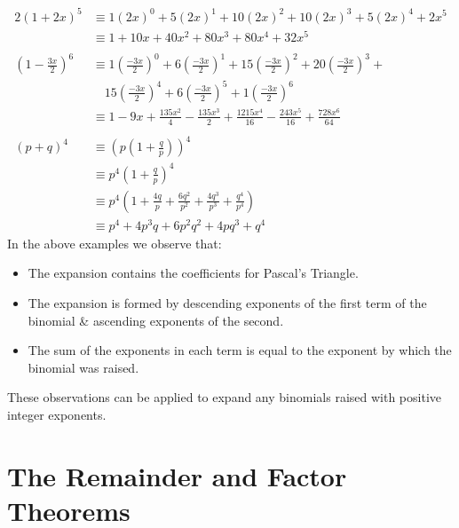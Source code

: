 \documentclass[12pt, a4paper]{report}
\theoremstyle{definition}
\begin{document}
	\begin{alignat*}{2}
		(1+2x)^5                      & \equiv 1(2x)^0 + 5(2x)^1 + 10(2x)^2 + 10(2x)^3 + 5(2x)^4 + 2x^5\tag*{a)}                                                                          \\
		& \equiv 1 + 10x + 40x^2 + 80x^3 + 80x^4 + 32x^5                                                                                                    \\
		\\	
		\left(1-\frac{3x}{2}\right)^6 & \equiv 1\left(\frac{-3x}{2}\right)^0 + 6\left(\frac{-3x}{2}\right)^1 + 15\left(\frac{-3x}{2}\right)^2 + 20\left(\frac{-3x}{2}\right)^3 +\tag*{b)} \\
		& \quad 15\left(\frac{-3x}{2}\right)^4 + 6\left(\frac{-3x}{2}\right)^5 + 1\left(\frac{-3x}{2}\right)^6                                              \\
		& \equiv 1 - 9x + \frac{135x^2}{4} - \frac{135x^3}{2} + \frac{1215x^4}{16} - \frac{243x^5}{16} + \frac{728x^6}{64}                                  \\
		&   \\(p+q)^4 &\equiv (p(1+\frac{q}{p}))^4\tag*{c)}\\
		& \equiv p^4\left(1+\frac{q}{p}\right)^4                                                                                                            \\
		& \equiv p^4\left(1 + \frac{4q}{p} + \frac{6q^2}{p^2} + \frac{4q^3}{p^3} + \frac{q^4}{p^4}\right)                                                   \\
		& \equiv p^4 + 4p^3q + 6p^2q^2 + 4pq^3 + q^4                                                                                                        
	\end{alignat*}
	In the above examples we observe that: 
	
	\begin{itemize}
		\item{The expansion contains the coefficients for Pascal's Triangle.}
		\item{The expansion is formed by descending exponents of the first term of the binomial \& ascending exponents of the second.}
		\item{The sum of the exponents in each term is equal to the 	exponent by which the binomial was raised.}
	\end{itemize}
	These observations can be applied to expand any binomials raised with positive integer exponents.
	\newpage
	\chapter{The Remainder and Factor Theorems}
\end{document}
